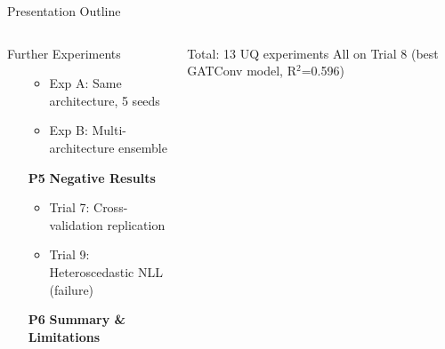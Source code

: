 \documentclass[aspectratio=169,10pt]{beamer}
\newcommand{\emphblue}[1]{\textcolor{tumblue}{\textbf{#1}}}
\begin{document}
\begin{frame}{Presentation Outline}
\begin{columns}[t]
\begin{block}{Further Experiments}
\begin{enumerate}
\begin{itemize}
              \item Exp A: Same architecture, 5 seeds
              \item Exp B: Multi-architecture ensemble
            \end{itemize}\vspace{0.3em}
          \item[\emphblue{P5}] \textbf{Negative Results}
            \begin{itemize}
              \item Trial 7: Cross-validation replication
              \item Trial 9: Heteroscedastic NLL (failure)
            \end{itemize}\vspace{0.3em}
          \item[\emphblue{P6}] \textbf{Summary \& Limitations}
        \end{enumerate}
      \end{block}
      \vspace{0.4em}
      \begin{alertblock}{Total: 13 UQ experiments}
        All on Trial 8 (best GATConv model, R$^2$=0.596)
      \end{alertblock}
  \end{columns}
\end{frame}
\end{document}
